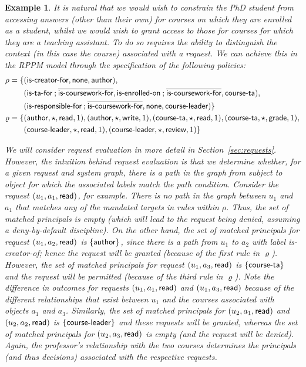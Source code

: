 \documentclass{article}
\newtheorem{example}{Example}
\newcommand{\set}[1]{\ensuremath{\left\{#1\right\}}} \newcommand{\setO}[1]{\ensuremath{\left\{#1\right.}} \newcommand{\setC}[1]{\ensuremath{\left.#1\right\}}} \newcommand{\setN}[1]{\ensuremath{\left.#1\right.}} \newcommand{\sett}[1]{\ensuremath{\left\{\textit{#1}\right\}}} \newcommand{\tuple}[1]{\ensuremath{\left(#1\right)}} \newcommand{\tuplet}[1]{\ensuremath{\left(\textit{#1}\right)}} \newcommand{\card}[1]{\left| #1 \right|}
\begin{document}
\begin{example}
It is natural that we would wish to constrain the PhD student from accessing answers (other than their own) for courses on which they are enrolled as a student, whilst we would wish to grant access to those for courses for which they are a teaching assistant.
To do so requires the ability to distinguish the context (in this case the course) associated with a request.
We can achieve this in the RPPM model through the specification of the following policies:
  \begin{align*}
   \rho = \{&(\textsf{is-creator-for},\mathsf{none},\textsf{author}), \\
        & (\textsf{is-ta-for} \mathbin{;} \overline{\textsf{is-coursework-for}}, \textsf{is-enrolled-on} \mathbin{;} \overline{\textsf{is-coursework-for}},\textsf{course-ta}), \\
        & (\textsf{is-responsible-for}  \mathbin{;} \overline{\textsf{is-coursework-for}},\mathsf{none},\textsf{course-leader})\} \\
   \varrho = \{&(\textsf{author},\star,\textsf{read},1),
         (\textsf{author},\star,\textsf{write},1),
         (\textsf{course-ta},\star,\textsf{read},1),
         (\textsf{course-ta},\star,\textsf{grade},1), \\
        & (\textsf{course-leader},\star,\textsf{read},1),
        (\textsf{course-leader},\star,\textsf{review},1) \}
  \end{align*}

We will consider request evaluation in more detail in Section~\ref{sec:requests}.
However, the intuition behind request evaluation is that we determine whether, for a given request and system graph, there is a path in the graph from subject to object for which the associated labels match the path condition.
Consider the request $(u_1, a_1, \textsf{read})$, for example.
There is no path in the graph between $u_1$ and $a_1$ that matches any of the mandated targets in rules within $\rho$.
Thus, the set of matched principals is empty (which will lead to the request being denied, assuming a deny-by-default discipline).
On the other hand, the set of matched principals for request $(u_1, a_2, \textsf{read})$ is $\set{\princ{author}}$, since there is a path from $u_1$ to $a_2$ with label \textsf{is-creator-of}; hence the request will be granted (because of the first rule in $\varrho$).
However, the set of matched principals for request $(u_1,a_3,\textsf{read})$ is $\set{\princ{course-ta}}$ and the request will be permitted (because of the third rule in $\varrho$).
Note the difference in outcomes for requests $(u_1,a_1,\textsf{read})$ and $(u_1,a_3,\textsf{read})$ because of the different relationships that exist between $u_1$ and the courses associated with objects $a_1$ and $a_3$.
Similarly, the set of matched principals for $(u_2,a_1,\textsf{read})$ and $(u_2,a_2,\textsf{read})$ is $\set{\princ{course-leader}}$ and these requests will be granted, whereas the set of matched principals for $(u_2,a_3,\textsf{read})$ is empty (and the request will be denied).
Again, the professor's relationship with the two courses determines the  principals (and thus decisions) associated with the respective requests.
\end{example}
\end{document}
